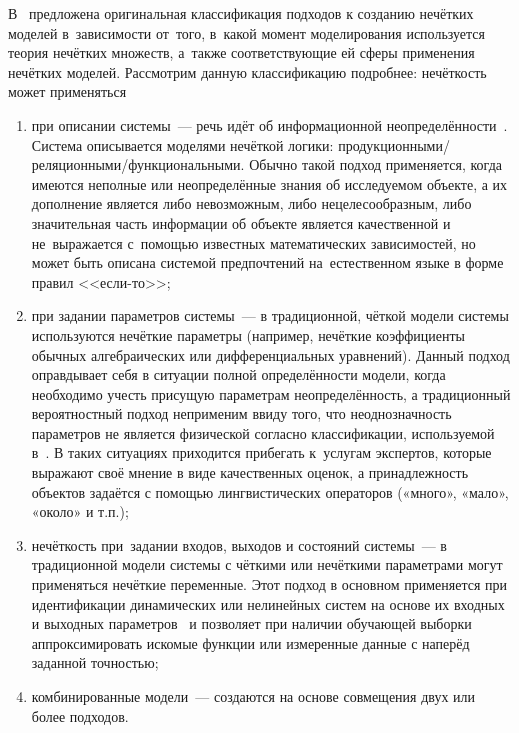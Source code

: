 В~\cite{Borisov_Fedulov} предложена оригинальная классификация подходов к созданию нечётких моделей в~зависимости от~того, в~какой момент моделирования используется теория нечётких множеств, а~также соответствующие ей сферы применения нечётких моделей. Рассмотрим данную классификацию подробнее: нечёткость может применяться
\begin{enumerate}
	\item при описании системы~--- речь идёт об информационной неопределённости~\cite{Pospelov, Borisov_Alexeev_Msk}. Система описывается моделями нечёткой логики: продукционными/реляционными/функциональными. Обычно такой подход применяется, когда имеются неполные или неопределённые знания об исследуемом объекте, а их дополнение является либо невозможным, либо нецелесообразным, либо значительная часть информации об объекте является качественной и не~выражается с~помощью известных математических зависимостей, но может быть описана системой предпочтений на~естественном языке в форме правил <<если-то>>;
	\item при задании параметров системы~--- в традиционной, чёткой модели системы используются нечёткие параметры (например, нечёткие коэффициенты обычных алгебраических или дифференциальных уравнений). Данный подход оправдывает себя в ситуации полной определённости модели, когда необходимо учесть присущую параметрам неопределённость, а традиционный вероятностный подход неприменим ввиду того, что неоднозначность параметров не является физической согласно классификации, используемой в~\cite{Borisov_Alexeev_Msk, Yarushkina}. В таких ситуациях приходится прибегать к~услугам экспертов, которые выражают своё мнение в виде качественных оценок, а принадлежность объектов задаётся с помощью лингвистических операторов («много», «мало», «около» и т.п.);
	\item нечёткость при~задании входов, выходов и состояний системы~--- в традиционной модели системы с чёткими или нечёткими параметрами могут применяться нечёткие переменные. Этот подход в основном применяется при идентификации динамических или нелинейных систем на основе их входных и выходных параметров~\cite{Fuller} и позволяет при наличии обучающей выборки аппроксимировать искомые функции или измеренные данные с наперёд заданной точностью;
	\item комбинированные модели~--- создаются на основе совмещения двух или более подходов.
\end{enumerate}

